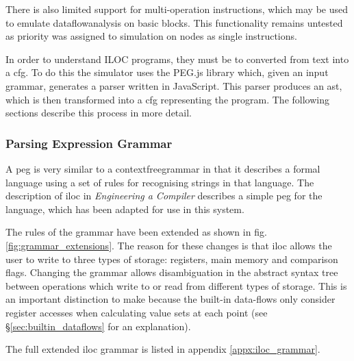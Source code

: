 \documentclass[bsc,twoside,singlespacing,parskip,logo,notimes,normalheadings]{infthesis}
\begin{document}
    There is also limited support for multi-operation instructions,
    which may be used to emulate \gls{dataflowanalysis} on basic
    blocks. This functionality remains untested as priority was
    assigned to simulation on nodes as single instructions.


    In order to understand ILOC programs, they must be to converted
    from text into a \gls{cfg}. To do this the simulator uses the
    PEG.js\cite{pegjs} library which, given an input grammar,
    generates a parser written in JavaScript. This parser produces an
    \gls{ast}, which is then transformed into a \gls{cfg} representing
    the program. The following sections describe this process in more
    detail.

        \subsubsection{Parsing Expression Grammar}\label{sec:peg}

        A \gls{peg} is very similar to a \gls{contextfreegrammar} in
        that it describes a formal language using a set of rules for
        recognising strings in that language. The description of
        \gls{iloc} in {\em Engineering a Compiler} describes a simple
        \gls{peg} for the language, which has been adapted for use in
        this system.
        
        The rules of the grammar have been extended as shown in
        fig. \ref{fig:grammar_extensions}. The reason for these
        changes is that \gls{iloc} allows the user to write to three
        types of storage: registers, main memory and comparison
        flags. Changing the grammar allows disambiguation in the
        abstract syntax tree between operations which write to or read
        from different types of storage. This is an important
        distinction to make because the built-in data-flows only
        consider register accesses when calculating value sets at each
        point (see \S\ref{sec:builtin_dataflows} for an explanation).

        The full extended \gls{iloc} grammar is listed in appendix
        \ref{appx:iloc_grammar}.
\end{document}
